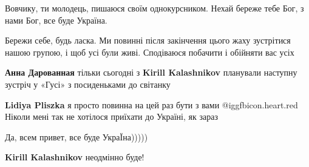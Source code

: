 \begin{itemize}
Вовчику, ти молодець, пишаюся своїм однокурсником. Нехай береже тебе Бог, з нами Бог, все буде Україна.


Бережи себе, будь ласка. Ми повинні після закінчення цього жаху зустрітися
нашою групою, і щоб усі були живі. Сподіваюся побачити і обійняти вас усіх

\textbf{Анна Дарованная} тільки сьогодні з \textbf{Kirill Kalashnikov} планували наступну зустріч у «Гусі» з посиденьками до світанку

\textbf{Lidiya Pliszka} я просто повинна на цей раз бути з вами @igg{fbicon.heart.red} Ніколи мені так не хотілося приїхати до Україні, як зараз

Да, всем привет, все буде УкраЇна)))))

\textbf{Kirill Kalashnikov} неодмінно буде!

\end{itemize} %
